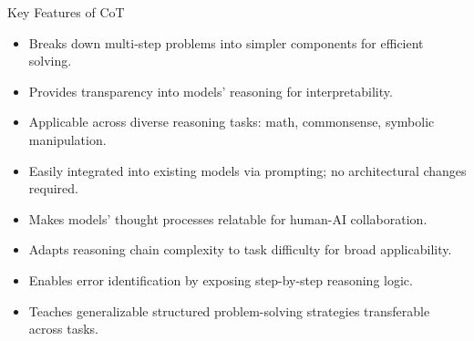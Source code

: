 




\begin{frame}[fragile]{Key Features of CoT}
    \begin{itemize}
        \item Breaks down multi-step problems into simpler components for efficient solving.
        \item Provides transparency into models' reasoning for interpretability.
        \item Applicable across diverse reasoning tasks: math, commonsense, symbolic manipulation.
        \item Easily integrated into existing models via prompting; no architectural changes required.
        \item Makes models' thought processes relatable for human-AI collaboration.
        \item Adapts reasoning chain complexity to task difficulty for broad applicability.
        \item Enables error identification by exposing step-by-step reasoning logic.
        \item Teaches generalizable structured problem-solving strategies transferable across tasks.
    \end{itemize}
\end{frame}

